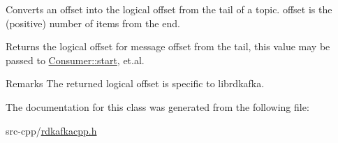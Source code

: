 Converts an offset into the logical offset from the tail of a topic. {\ttfamily offset} is the (positive) number of items from the end.

\begin{DoxyReturn}{Returns}
the logical offset for message {\ttfamily offset} from the tail, this value may be passed to \hyperlink{classRdKafka_1_1Consumer_ad2044e3433f626baff667e1a429d6f33}{Consumer::start}, et.al. 
\end{DoxyReturn}
\begin{DoxyRemark}{Remarks}
The returned logical offset is specific to librdkafka. 
\end{DoxyRemark}


The documentation for this class was generated from the following file:\begin{DoxyCompactItemize}
\item 
src-\/cpp/\hyperlink{rdkafkacpp_8h}{rdkafkacpp.h}\end{DoxyCompactItemize}
